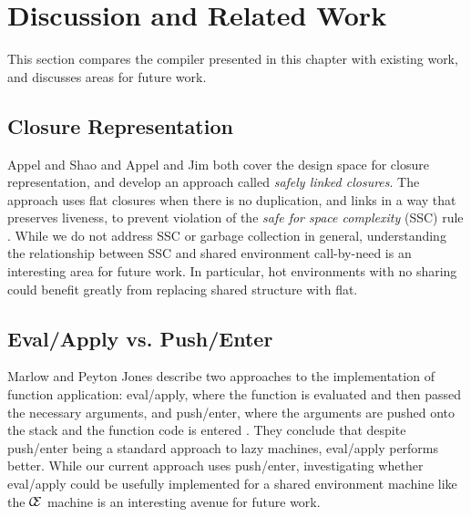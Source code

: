 \section{Discussion and Related Work} \label{sec:disc}

This section compares the compiler presented in this chapter with existing work,
and discusses areas for future work.

\subsection{Closure Representation}
Appel and Shao \cite{shao1994space} and Appel and Jim \cite{appel1988optimizing}
both cover the design space for closure representation, and develop an approach
called \emph{safely linked closures}. The approach uses flat closures when
there is no duplication, and links in a way that preserves liveness, to prevent
violation of the \emph{safe for space complexity} (SSC) rule
\cite{shao1994space}. While we do not address SSC or garbage collection in
general, understanding the relationship between SSC and shared environment
call-by-need is an interesting area for future work. In particular, hot
environments with no sharing could benefit greatly from replacing shared
structure with flat.

\subsection{Eval/Apply vs. Push/Enter}
Marlow and Peyton Jones describe two approaches to the implementation of
function application: eval/apply, where the function is evaluated and then
passed the necessary arguments, and push/enter, where the arguments are pushed
onto the stack and the function code is entered \cite{marlow2006making}. They
conclude that despite push/enter being a standard approach to lazy machines,
eval/apply performs better. While our current approach uses push/enter,
investigating whether eval/apply could be usefully implemented for a shared
environment machine like the $\mathcal{\mathcal{C} \mskip -4mu \mathcal{E}}$
machine is an interesting avenue for future work.

